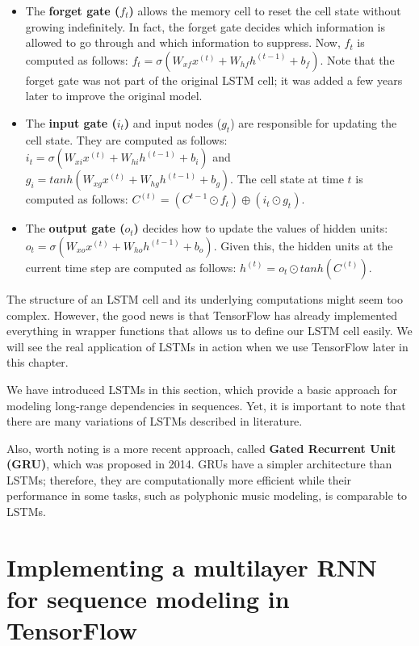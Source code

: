 \documentclass[11pt]{article}
\providecommand{\tightlist}{%
      \setlength{\itemsep}{0pt}\setlength{\parskip}{0pt}}
\begin{document}
\begin{itemize}
\tightlist
\item
  The \textbf{forget gate (\(f_t\))} allows the memory cell to reset the
  cell state without growing indefinitely. In fact, the forget gate
  decides which information is allowed to go through and which
  information to suppress. Now, \(f_t\) is computed as follows:
  \(f_t = \sigma(W_{xf}x^{(t)} + W_{hf}h^{(t-1)} + b_f)\). Note that the
  forget gate was not part of the original LSTM cell; it was added a few
  years later to improve the original model.
\item
  The \textbf{input gate (\(i_t\))} and input nodes (\(g_t\)) are
  responsible for updating the cell state. They are computed as follows:
  \(i_t = \sigma(W_{xi}x^{(t)} + W_{hi}h^{(t-1)} + b_i)\) and
  \(g_i = tanh(W_{xg}x^{(t)} + W_{hg}h^{(t-1)} + b_g)\). The cell state
  at time \(t\) is computed as follows:
  \(C^{(t)} = (C^{t-1} \odot f_t) \oplus (i_t \odot g_t)\).
\item
  The \textbf{output gate (\(o_t\))} decides how to update the values of
  hidden units: \(o_t = \sigma(W_{xo}x^{(t)} + W_{ho}h^{(t-1)} + b_o)\).
  Given this, the hidden units at the current time step are computed as
  follows: \(h^{(t)} = o_t \odot tanh(C^{(t)})\).
\end{itemize}

The structure of an LSTM cell and its underlying computations might seem
too complex. However, the good news is that TensorFlow has already
implemented everything in wrapper functions that allows us to define our
LSTM cell easily. We will see the real application of LSTMs in action
when we use TensorFlow later in this chapter.

We have introduced LSTMs in this section, which provide a basic approach
for modeling long-range dependencies in sequences. Yet, it is important
to note that there are many variations of LSTMs described in literature.

Also, worth noting is a more recent approach, called \textbf{Gated
Recurrent Unit (GRU)}, which was proposed in 2014. GRUs have a simpler
architecture than LSTMs; therefore, they are computationally more
efficient while their performance in some tasks, such as polyphonic
music modeling, is comparable to LSTMs.

    \section{Implementing a multilayer RNN for sequence modeling in
TensorFlow}\label{implementing-a-multilayer-rnn-for-sequence-modeling-in-tensorflow}
\end{document}

